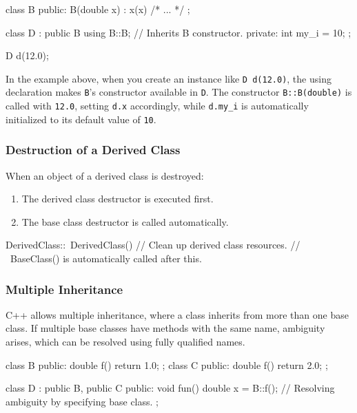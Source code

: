 \begin{codeblock}[language=C++]
class B {
public:
    B(double x) : x(x) { /* ... */ }
};

class D : public B {
    using B::B; // Inherits B constructor.
private:
    int my_i = 10;
};

D d(12.0);
\end{codeblock}

In the example above, when you create an instance like \texttt{D d(12.0)}, the using declaration makes \texttt{B}'s constructor available in \texttt{D}. The constructor \texttt{B::B(double)} is called with \texttt{12.0}, setting \texttt{d.x} accordingly, while \texttt{d.my\_i} is automatically initialized to its default value of \texttt{10}.

\subsubsection{Destruction of a Derived Class}

When an object of a derived class is destroyed:

\begin{enumerate}
    \item The derived class destructor is executed first.
    \item The base class destructor is called automatically.
\end{enumerate}

\begin{codeblock}[language=C++, numbers=none]
DerivedClass::~DerivedClass() {
    // Clean up derived class resources.
    // ~BaseClass() is automatically called after this.
}
\end{codeblock}

\subsubsection{Multiple Inheritance}

C++ allows multiple inheritance, where a class inherits from more than one base class. If multiple base classes have methods with the same name, ambiguity arises, which can be resolved using fully qualified names.

\begin{codeblock}[language=C++, numbers=none]
class B { public: double f() { return 1.0; } };
class C { public: double f() { return 2.0; } };

class D : public B, public C {
public:
    void fun() {
        double x = B::f(); // Resolving ambiguity by specifying base class.
    }
};
\end{codeblock}

